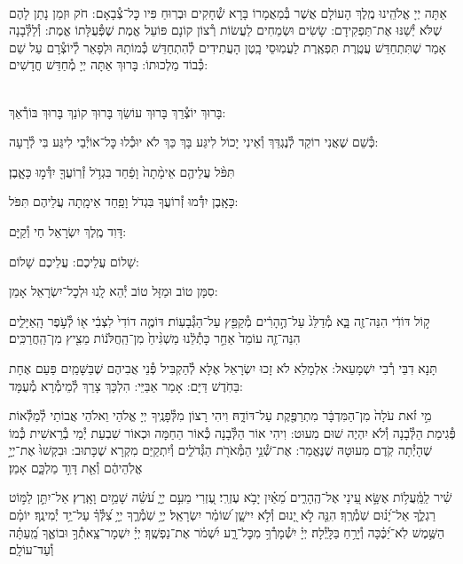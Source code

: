 \documentclass[twoside, openany, parskip=half, 11pt]{book}
\begin{document}
\\
אַתָּה יְיָ אֱלֹהֵֽינוּ מֶֽלֶךְ הָעוֹלָם אֲשֶׁר בְּ֯מַאֲמָרוֹ בָּרָא שְׁ֯חָקִים וּבְרֽוּחַ פִּיו כׇּל־צְ֯בָאָם: חֹק וּזְמַן נָתַן לָהֶם שֶׁלֹּא יְ֯שַׁנּוּ אֶת־תַּפְקִידָם: שָׂשִׂים וּשְׂמֵחִים לַעֲשׂוֹת רְ֯צוֹן קוֹנָם פּוֹעֵל אֱמֶת שֶׁפְּ֯עֻלָּתוֹ אֱמֶת: וְ֯לַלְּ֯בָנָה אָמַר שֶׁתִּתְחַדֵּשׁ עֲטֶֽרֶת תִּפְאֶֽרֶת לַעֲמֽוּסֵי בָֽטֶן הָעֲתִידִים לְ֯הִתְחַדֵּשׁ כְּ֯מוֹתָהּ וּלְפָאֵר לְ֯יוֹצְ֯רָם עַל שֵׁם כְּ֯בוֹד מַלְכוּתוֹ: בָּרוּךְ אַתָּה יְיָ מְ֯חַדֵּשׁ חֳדָשִׁים:

\\
בָּרוּךְ יוֹצְ֯רֵךְ בָּרוּךְ עוֹשֵׂךְ בָּרוּךְ קוֹנֵךְ בָּרוּךְ בּוֹרְ֯אֵךְ:

כְּ֯שֵׁם שֶׁאֲנִי רוֹקֵד לְ֯נֶגְדֵּךְ וְ֯אֵינִי יָכוֹל לִיגַּע בָּךְ
כַּךְ לֹא יוּכְ֯לוּ כׇּל־אוֹיְ֯בַי לִיגַּע בִּי לְ֯רָעָה:

תִּפֹּ֨ל עֲלֵיהֶ֤ם אֵימָ֨תָה֙ וָפַ֔חַד בִּגְדֹ֥ל זְ֯רֽוֹעֲךָ֖ יִדְּ֯מ֣וּ כָּאָ֑בֶן׃


כָּאָֽבֶן יִדְּ֯מוּ זְ֯רוֹעֲךָ בִּגְדֹל וָפַֽחַד אֵימָֽתָה עֲלֵיהֶם תִּפֹּל:


דָּוִד מֶֽלֶךְ יִשְׂרָאֵל חַי וְ֯קַיָּם:

שָׁלוֹם עֲלֵיכֶם: \qquad {}
עֲלֵיכֶם שָׁלוֹם:


סִמָּן טוֹב וּמַזָּל טוֹב יְ֯הֵא לָֽנוּ וּלְכׇל־יִשְׂרָאֵל אָמֵן:

ק֣וֹל דּוֹדִ֔י הִנֵּה־זֶ֖ה בָּ֑א מְ֯דַלֵּג֙ עַל־הֶ֣הָרִ֔ים מְ֯קַפֵּ֖ץ עַל־הַגְּ֯בָעֽוֹת׃ דּוֹמֶ֤ה דוֹדִי֙ לִצְבִ֔י א֖וֹ לְ֯עֹ֣פֶר הָֽאַיָּלִ֑ים הִנֵּה־זֶ֤ה עוֹמֵד֙ אַחַ֣ר כָּתְ֯לֵ֔נוּ מַשְׁגִּ֨יחַ֙ מִן־הַֽחֲלֹּנ֔וֹת מֵצִ֖יץ מִן־הַֽחֲרַכִּֽים׃

תָּנָא דִבֵּי רְ֯בִי יִשְׁמָעֵאל: אִלְמָלֵא לֹא זָכוּ יִשְׂרָאֵל אֶלָּא לְ֯הַקְבִּיל פְּ֯נֵי אֲבִיהֶם שֶׁבַּשָּׁמַֽיִם פַּעַם אֶחָת בַּחֹֽדֶשׁ דַּיָּם: אָמַר אַבַּיֵּי: הִלְכָּךְ צָרֵךְ לְ֯מֵימְ֯רָא מְ֯עֻמָּד:

מִ֣י זֹ֗את עֹלָה֙ מִן־הַמִּדְבָּ֔ר מִתְרַפֶּ֖קֶת עַל־דּוֹדָ֑הּ׃
וִיהִי רָצוֹן מִלְּ֯פָנֶֽיךָ יְיָ אֱלֹהַי וֵאלֹהֵי אֲבוֹתַי לְ֯מַלְּ֯אוֹת פְּ֯גִימַת הַלְּ֯בָנָה וְ֯לֹא יִהְיֶה שׁוּם מִעוּט: וִיהִי אוֹר הַלְּ֯בָנָה כְּ֯אוֹר הַחַמָּה וּכְאוֹר שִׁבְעַת יְ֯מֵי בְ֯רֵאשִׁית כְּ֯מוֹ שֶׁהָיְ֯תָה קֹֽדֶם מִעוּטָהּ שֶׁנֶּאֱמַר:
אֶת־שְׁ֯נֵ֥י הַמְּ֯אֹרֹ֖ת הַגְּ֯דֹלִ֑ים וְ֯יִתְקַיַּם מִקְרָא שֶׁכָּתוּב: וּבִקְשׁוּ֙ אֶת־יְיָ֣ אֱלֹֽהֵיהֶ֔ם וְ֯אֵ֖ת דָּוִ֣ד מַלְכָּ֑ם אָמֵן׃


שִׁ֗יר לַֽמַּֽ֫עֲל֥וֹת אֶשָּׂ֣א עֵ֭ינַי אֶל־הֶֽהָרִ֑ים מֵ֝אַ֗יִן יָבֹ֥א עֶזְרִֽי׃ עֶ֭זְרִי מֵעִ֣ם יְיָ֑ עֹ֝שֵׂ֗ה שָׁמַ֥יִם וָאָֽרֶץ׃ אַל־יִתֵּ֣ן לַמּ֣וֹט רַגְלֶ֑ךָ אַל־יָ֝נ֗וּם שֹֽׁמְ֯רֶֽךָ׃ הִנֵּ֤ה לֹ֣א יָ֭נוּם וְ֯לֹ֣א יִישָׁ֑ן שׁ֝וֹמֵ֗ר יִשְׂרָאֵֽל׃ יְיָ֥ שֹֽׁמְ֯רֶ֑ךָ יְיָ֥ צִ֝לְּ֯ךָ֗ עַל־יַ֥ד יְ֯מִינֶֽךָ׃ יוֹמָ֗ם הַשֶּׁ֥מֶשׁ לֹֽא־יַ֝כֶּ֗כָּה וְ֯יָרֵ֥חַ בַּלָּֽיְ֯לָה׃ יְיָ֗ יִשְׁ֯מָרְ֯ךָ֥ מִכׇּל־רָ֑ע יִ֝שְׁמֹ֗ר אֶת־נַפְשֶֽׁךָ׃ יְיָ֗ יִשְׁמָר־צֵֽאתְ֯ךָ֥ וּבוֹאֶ֑ךָ מֵֽ֝עַתָּ֗ה וְ֯עַד־עוֹלָֽם׃
\end{document}
